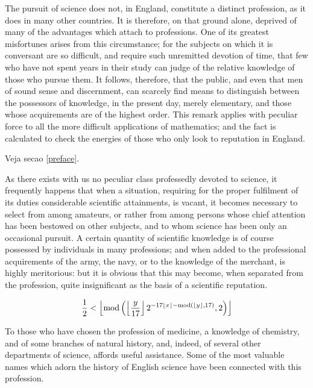 \documentclass{aa}
\begin{document}
The pursuit of science does not, in England, constitute a distinct
profession, as it does in many other countries. It is therefore, on
that ground alone, deprived of many of the advantages which attach
to professions. One of its greatest misfortunes arises from this
circumstance; for the subjects on which it is conversant are so
difficult, and require such unremitted devotion of time, that few who
have not spent years in their study can judge of the relative knowledge
of those who pursue them. It follows, therefore, that the public, and
even that men of sound sense and discernment, can scarcely find means
to distinguish between the possessors of knowledge, in the present
day, merely elementary, and those whose acquirements are of the highest
order. This remark applies with peculiar force to all the more difficult
applications of mathematics; and the fact is calculated to check the
energies of those who only look to reputation in England.

Veja secao \ref{preface}.

As there exists with us no peculiar class professedly devoted to
science, it frequently happens that when a situation, requiring for the
proper fulfilment of its duties considerable scientific attainments, is
vacant, it becomes necessary to select from among amateurs, or rather
from among persons whose chief attention has been bestowed on other
subjects, and to whom science has been only an occasional pursuit.
A certain quantity of scientific knowledge is of course possessed by
individuals in many professions; and when added to the professional
acquirements of the army, the navy, or to the knowledge of the merchant,
is highly meritorious: but it is obvious that this may become, when
separated from the profession, quite insignificant as the basis of a
scientific reputation.

\begin{equation}
    \frac{1}{2} < \left\lfloor \textnormal{mod} \left( \left\lfloor \frac{y}{17} \right\rfloor 2^{-17\left\lfloor x \right\rfloor - \textnormal{mod}\left( \left\lfloor y \right \rfloor ,  17 \right)}, 2 \right) \right\rfloor
    \label{Quine}
\end{equation}

To those who have chosen the profession of medicine, a knowledge of
chemistry, and of some branches of natural history, and, indeed, of
several other departments of science, affords useful assistance. Some of
the most valuable names which adorn the history of English science have
been connected with this profession.
\end{document}
